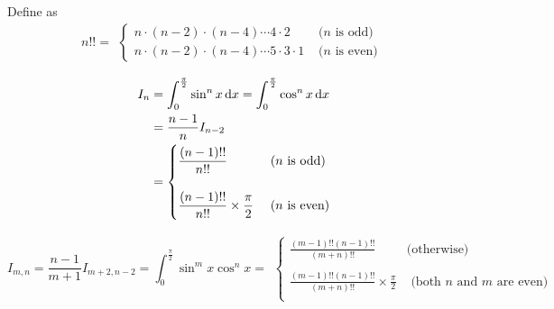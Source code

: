 \begin{theorem}

Define  as
\begin{equation}
    n!! = \begin{aligned}
        \begin{cases}
        n \cdot (n-2) \cdot (n-4) \cdots 4 \cdot 2  & \text{ (} n \text{ is odd)} \\
        n \cdot (n-2) \cdot (n-4) \cdots 5 \cdot 3 \cdot 1  & \text{ (} n \text{ is even)} 
    \end{cases}
    \end{aligned}    
\end{equation}

\begin{equation}
    \begin{aligned}
        I_n &= \int_0^\frac{\pi}{2} \sin^n x \dif x = \int_0^\frac{\pi}{2} \cos^n x \dif x  \\
        &= \frac{n-1}{n} I_{n-2} \\
        &= \begin{cases}
            \displaystyle \frac{(n-1)!!}{n!!} & \text{ (} n \text{ is odd)}\\
            \\
            \displaystyle \frac{(n-1)!!}{n!!} \times \frac{\pi}{2} & \text{ (} n \text{ is even)}
        \end{cases}
    \end{aligned}
\end{equation}

\begin{equation}
    I_{m,n} = \frac{n-1}{m+1} I_{m+2, n-2} = \int_{0}^{\frac{\pi}{2}} \sin^m x \cos^n x = \begin{aligned}
        \begin{cases}
            \displaystyle \frac{(m-1)!! (n-1)!!}{(m+n)!!} & \text{(otherwise)}\\
            \\
            \displaystyle \frac{(m-1)!! (n-1)!!}{(m+n)!!} \times \frac{\pi}{2} & \text{ (both } n \text{ and } m \text{ are even)}\\
        \end{cases}
    \end{aligned}
\end{equation}

\end{theorem}



